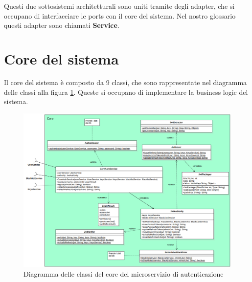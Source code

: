 Questi due sottosistemi architetturali sono uniti tramite degli adapter, che si occupano di interfacciare le ports con il core del sistema. Nel nostro glossario questi adapter sono chiamati \textbf{Service}.

\section{Core del sistema}

Il core del sistema è composto da 9 classi, che sono rappresentate nel diagramma delle classi alla figura \ref{fig:classi_auth}. Queste si occupano di implementare la business logic del sistema.

\begin{figure}[ht]
    \centering
    \includegraphics[width=\textwidth]{img/classi_auth.png}
    \caption{Diagramma delle classi del core del microservizio di autenticazione}
    \label{fig:classi_auth}
\end{figure}

